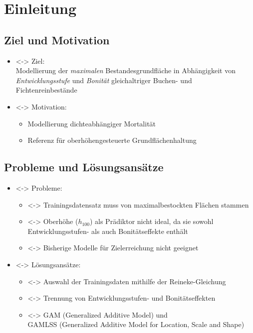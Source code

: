 \section{Einleitung}
\subsection{Ziel und Motivation}

\begin{frame}[c]
  \begin{itemize}
  \item<\theFirstElement-> Ziel: \\
    Modellierung der \emph{maximalen} Bestandesgrundfläche in Abhängigkeit von \emph{Entwicklungsstufe} und \emph{Bonität} gleichaltriger Buchen- und Fichtenreinbestände
  \item<\theFirstElement-> Motivation:
    \begin{itemize}
    \item Modellierung dichteabhängiger Mortalität
    \item Referenz für oberhöhengesteuerte Grundflächenhaltung
    \end{itemize}
  \end{itemize}
\end{frame}

\subsection{Probleme und Lösungsansätze}
\begin{frame}[c]
  \begin{itemize}
  \item<\theFirstElement-> Probleme:
    \begin{itemize}
    \item<\theFirstElement-> Trainingsdatensatz muss von maximalbestockten Flächen stammen
    \item<\theSecondElement-> Oberhöhe (\(h_{100}\)) als Prädiktor nicht ideal, da sie sowohl Entwicklungsstufen- als auch Bonitätseffekte enthält
    \item<\theThirdElement-> Bisherige Modelle für Zielerreichung nicht geeignet
    \end{itemize}
  \end{itemize}
  \begin{itemize}
  \item<\theFirstElement-> Lösungsansätze:
    \begin{itemize}
    \item<\theFirstElement-> Auswahl der Trainingsdaten mithilfe der Reineke-Gleichung
    \item<\theSecondElement-> Trennung von Entwicklungsstufen- und Bonitätseffekten
    \item<\theThirdElement-> GAM (Generalized Additive Model) und \\
      GAMLSS (Generalized Additive Model for Location, Scale and Shape)
    \end{itemize}
  \end{itemize}
\end{frame}

